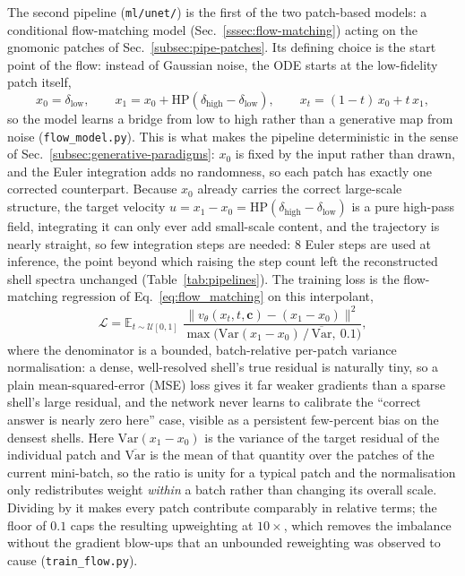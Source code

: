 \documentclass{report}
\begin{document}
The second pipeline (\texttt{ml/unet/}) is the first of the two patch-based models: a conditional flow-matching model (Sec.~\ref{sssec:flow-matching}) acting on the gnomonic patches of Sec.~\ref{subsec:pipe-patches}. Its defining choice is the start point of the flow: instead of Gaussian noise, the ODE starts at the low-fidelity patch itself,
\begin{equation}
  x_0 = \delta_{\mathrm{low}}, \qquad
  x_1 = x_0 + \mathrm{HP}\!\left(\delta_{\mathrm{high}} - \delta_{\mathrm{low}}\right), \qquad
  x_t = (1-t)\,x_0 + t\,x_1,
  \label{eq:flow_bridge}
\end{equation}
so the model learns a bridge from low to high rather than a generative map from noise (\texttt{flow\_model.py}). This is what makes the pipeline deterministic in the sense of Sec.~\ref{subsec:generative-paradigms}: \mbox{$x_0$} is fixed by the input rather than drawn, and the Euler integration adds no randomness, so each patch has exactly one corrected counterpart. Because \mbox{$x_0$} already carries the correct large-scale structure, the target velocity \mbox{$u = x_1 - x_0 = \mathrm{HP}(\delta_{\mathrm{high}} - \delta_{\mathrm{low}})$} is a pure high-pass field, integrating it can only ever add small-scale content, and the trajectory is nearly straight, so few integration steps are needed: 8 Euler steps are used at inference, the point beyond which raising the step count left the reconstructed shell spectra unchanged (Table~\ref{tab:pipelines}). The training loss is the flow-matching regression of Eq.~\eqref{eq:flow_matching} on this interpolant,
\begin{equation}
  \mathcal{L} = \mathbb{E}_{t \sim \mathcal{U}[0,1]}\;
  \frac{\big\lVert v_\theta(x_t, t, \mathbf{c}) - (x_1 - x_0) \big\rVert^2}{\max\!\big(\mathrm{Var}(x_1{-}x_0)\,/\,\overline{\mathrm{Var}},\ 0.1\big)},
  \label{eq:flow_loss}
\end{equation}
where the denominator is a bounded, batch-relative per-patch variance normalisation: a dense, well-resolved shell's true residual is naturally tiny, so a plain mean-squared-error (MSE) loss gives it far weaker gradients than a sparse shell's large residual, and the network never learns to calibrate the ``correct answer is nearly zero here'' case, visible as a persistent few-percent bias on the densest shells. Here \mbox{$\mathrm{Var}(x_1{-}x_0)$} is the variance of the target residual of the individual patch and \mbox{$\overline{\mathrm{Var}}$} is the mean of that quantity over the patches of the current mini-batch, so the ratio is unity for a typical patch and the normalisation only redistributes weight \emph{within} a batch rather than changing its overall scale. Dividing by it makes every patch contribute comparably in relative terms; the floor of \mbox{$0.1$} caps the resulting upweighting at \mbox{$10\times$}, which removes the imbalance without the gradient blow-ups that an unbounded reweighting was observed to cause (\texttt{train\_flow.py}).
\end{document}
